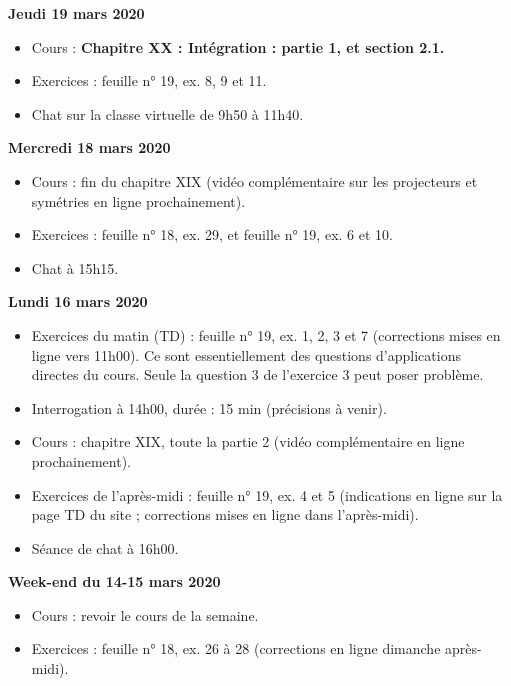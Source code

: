 \documentclass[12pt,a4paper]{article}
\begin{document}
\noindent\textbf{Jeudi 19 mars 2020}
\begin{itemize}
\item Cours : \bf Chapitre XX \rm : Intégration : partie 1, et section 2.1.
\item Exercices : feuille n° 19, ex. 8, 9 et 11.
\item Chat sur la classe virtuelle de 9h50 à 11h40.\vspace{.4cm}
\end{itemize}

\noindent\textbf{Mercredi 18 mars 2020}
\begin{itemize}
\item Cours : fin du chapitre XIX (vidéo complémentaire sur les projecteurs et symétries en ligne prochainement).
\item Exercices : feuille n° 18, ex. 29, et feuille n° 19, ex. 6 et 10.
\item Chat à 15h15.\vspace{.4cm}
\end{itemize}

\noindent\textbf{\bf Lundi 16 mars 2020}
\begin{itemize}
\item Exercices du matin (TD) : feuille n° 19, ex. 1, 2, 3 et 7 (corrections mises en ligne vers 11h00). Ce sont essentiellement des questions d'applications directes du cours. Seule la question 3 de l'exercice 3 peut poser problème.
\item Interrogation à 14h00, durée : 15 min (précisions à venir).
\item Cours : chapitre XIX, toute la partie 2 (vidéo complémentaire en ligne prochainement).
\item Exercices de l'après-midi : feuille n° 19, ex. 4 et 5 (indications en ligne sur la page TD du site ; corrections mises en ligne dans l'après-midi).
\item Séance de chat à 16h00.
\vspace{.4cm}
\end{itemize}

\noindent\textbf{Week-end du 14-15 mars 2020}
\begin{itemize}
\item Cours : revoir le cours de la semaine.
\item Exercices : feuille n° 18, ex. 26 à 28 (corrections en ligne dimanche après-midi).\vspace{.4cm}
\end{itemize}


\label{end}
\end{document}
